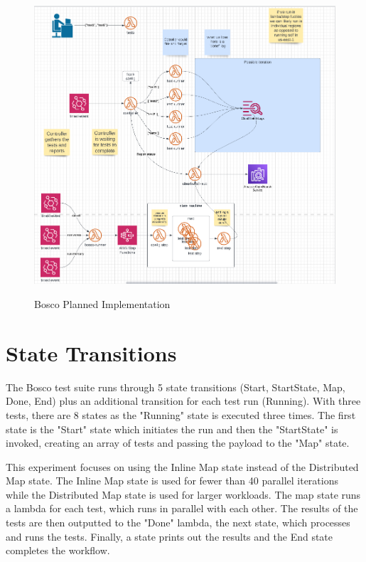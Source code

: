 \documentclass[12pt,a4paper,titlepage]{report}
\begin{document}
\begin{figure}
  \centering
  {\includegraphics[width=15cm]{./diagrams/possible_implementation}}
  \caption{Bosco Planned Implementation}
\end{figure}

\section{State Transitions}

The Bosco test suite runs through 5 state transitions (Start, StartState, Map, Done, End) plus an additional transition for each test run (Running). With three tests, there are 8 states as the "Running" state is executed three times. The first state is the "Start" state which initiates the run and then the "StartState" is invoked, creating an array of tests and passing the payload to the "Map" state.

This experiment focuses on using the Inline Map state instead of the Distributed Map state. The Inline Map state is used for fewer than 40 parallel iterations while the Distributed Map state is used for larger workloads. The map state runs a lambda for each test, which runs in parallel with each other. The results of the tests are then outputted to the "Done" lambda, the next state, which processes and runs the tests. Finally, a state prints out the results and the End state completes the workflow.
\end{document}
